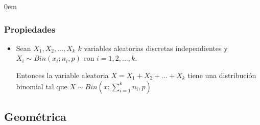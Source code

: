 \documentclass[12pt, fleqn]{report}                             %
\newenvironment{SmallIndentation}[1][0.75em]                    %
        {\begin{adjustwidth}{#1}{}\begin{footnotesize}}             %
        {\end{footnotesize}\end{adjustwidth}}                       %
\theoremstyle{break}                                            %
\newcommand{\Wrap}[1]           {\left( #1 \right)}             %
\begin{document}
\begin{multicols}{2}
\begin{SmallIndentation}[0em]
                    \subsubsection{Propiedades}  

                        \begin{itemize}
                            
                            \item 

                                Sean $X_1, X_2, \dots, X_k$ $k$ variables aleatorias discretas independientes
                                y $X_i \sim Bin(x_i; n_i, p)$ con $i = 1, 2, \dots, k$.

                                Entonces la variable aleatoria $X = X_1 + X_2 + \dots + X_k$ tiene una 
                                distribución binomial tal que $X \sim Bin\Wrap{x; \sum_{i=1}^k n_i, p}$ 

                        \end{itemize}


                \end{SmallIndentation}
                \end{multicols}



            \clearpage
            \subsection{Geométrica}
\end{document}
